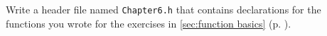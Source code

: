 %
%
\begin{question}
Write a header file named \verb|Chapter6.h| that contains
declarations for the functions you wrote for the exercises in \ref{sec:function basics} (p. \pageref{sec:function basics}).
\end{question}
